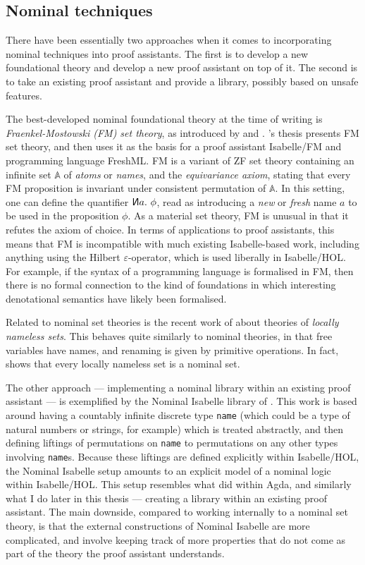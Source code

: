 \subsection{Nominal techniques}

There have been essentially two approaches when it comes to incorporating
nominal techniques into proof assistants.
The first is to develop a new foundational theory and develop a new proof
assistant on top of it.
The second is to take an existing proof assistant and provide a library,
possibly based on unsafe features.

The best-developed nominal foundational theory at the time of writing is
\emph{Fraenkel-Mostowski (FM) set theory}, as introduced by
\citet{Gabbay-thesis} and \citet{GP02}.
\citeauthor{Gabbay-thesis}'s thesis presents FM set theory, and then uses it as
the basis for a proof assistant Isabelle/FM and programming language FreshML\@.
FM is a variant of ZF set theory containing an infinite set $\mathbb A$ of
\emph{atoms} or \emph{names}, and the \emph{equivariance axiom}, stating that
every FM proposition is invariant under consistent permutation of $\mathbb A$.
In this setting, one can define the quantifier
$\reflectbox{$\mathsf N$}a.~\phi$,
read as introducing a \emph{new} or \emph{fresh} name $a$ to be used in the
proposition $\phi$.
As a material set theory, FM is unusual in that it refutes the axiom of choice.
In terms of applications to proof assistants, this means that FM is incompatible
with much existing Isabelle-based work, including anything using the Hilbert
$\varepsilon$-operator, which is used liberally in Isabelle/HOL\@.
For example, if the syntax of a programming language is formalised in FM, then
there is no formal connection to the kind of foundations in which interesting
denotational semantics have likely been formalised.

Related to nominal set theories is the recent work of \citet{Pitts23} about
theories of \emph{locally nameless sets}.
This behaves quite similarly to nominal theories, in that free variables have
names, and renaming is given by primitive operations.
In fact, \citet{Pitts23} shows that every locally nameless set is a nominal set.

The other approach --- implementing a nominal library within an existing proof
assistant --- is exemplified by the Nominal Isabelle library of \citet{Urban08}.
This work is based around having a countably infinite discrete type
\texttt{name} (which could be a type of natural numbers or strings, for example)
which is treated abstractly, and then defining liftings of permutations on
\texttt{name} to permutations on any other types involving \texttt{name}s.
Because these liftings are defined explicitly within Isabelle/HOL, the Nominal
Isabelle setup amounts to an explicit model of a nominal logic within
Isabelle/HOL\@.
This setup resembles what \citet{AACMM21} did within Agda, and similarly what I
do later in this thesis --- creating a library within an existing proof
assistant.
The main downside, compared to working internally to a nominal set theory, is
that the external constructions of Nominal Isabelle are more complicated, and
involve keeping track of more properties that do not come as part of the theory
the proof assistant understands.

